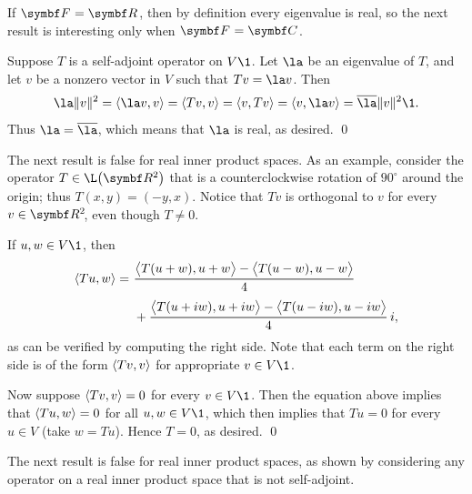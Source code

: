 {If $\F{} = \R{}$, then by definition every eigenvalue is real, so the next result is interesting only when\/ $\F{} = \C{}$.


\proof
Suppose $T$ is a self-adjoint operator on $V\1$. Let $\la$ be an eigenvalue of $T$,
and let $v$ be a nonzero vector in $V$ such that $Tv = \la v$.  Then
\[
\la \| v \|^2 = \ip{\la v, v}
= \ip{Tv, v}
= \ip{v, Tv}
= \ip{v, \la v}
= \bar{\la} \| v \|^2\1.
\]
Thus $\la = \bar{\la}$, which means that $\la$ is real, as desired.
\qed

} %

\pagebreak[3]

The next result is false for real inner product spaces.  As an example,
consider the operator $T \in \L\paren[\big]{\R{2}}$ that is a counterclockwise rotation
of $90^\circ$ around the origin; thus $T(x, y) = (-y, x)$.  Notice that $Tv$ is
orthogonal to $v$ for every \mbox{$v \in \RR{2}$}, even though $T \ne 0$.


\proof
If $u, w \in V\1$, then
\begin{align*}
\ip{Tu, w} =\ &\frac{\ip[\big]{T(u+w), u + w} - \ip[\big]{T(u-w), u - w}}{4} \\[3bp]
&+ \frac{\ip[\big]{T(u+iw), u+iw}- \ip[\big]{T(u-iw), u - iw}}{4} \,  i,
\end{align*}
as can be verified by computing the right side.  Note that each term on the right side is of the form $\langle Tv, v\rangle$ for appropriate
$v \in V\1$.

Now suppose $\langle Tv, v\rangle = 0$ for every $v \in V\1$. Then the equation above implies that $\langle Tu, w\rangle = 0$ for all $u, w \in V\1$, which then implies that $Tu = 0$ for every $u \in V$ (take $w = Tu$). Hence $T = 0$, as desired.
\qed


The next result is false for real inner product spaces, as
shown by considering any operator on a real inner product space that
is not self-adjoint.

